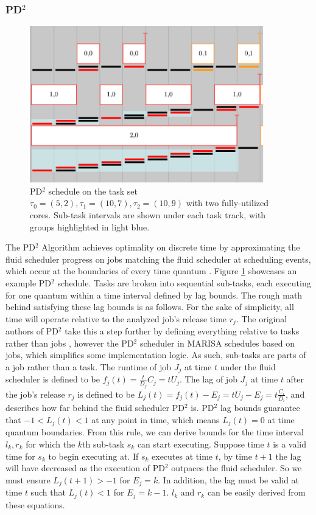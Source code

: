 \documentclass[conference,compsoc]{IEEEtran}
\begin{document}
\subsubsection{PD$^2$}
\begin{figure}
\includegraphics[width=4in]{MARISA_pd2.png}
\caption{PD$^2$ schedule on the task set $\tau_0 = (5,2), \tau_1 = (10,7), \tau_2 = (10, 9)$ with two fully-utilized cores. Sub-task intervals are shown under each task track, with groups highlighted in light blue.}
\label{fig_pd2}
\end{figure}
The PD$^2$ Algorithm achieves optimality on discrete time by approximating the fluid scheduler progress on jobs matching the fluid scheduler at scheduling events, which occur at the boundaries of every time quantum \cite{pd2}. Figure \ref{fig_pd2} showcases an example PD$^2$ schedule. Tasks are broken into sequential sub-tasks, each executing for one quantum within a time interval defined by lag bounds. The rough math behind satisfying these lag bounds is as follows. For the sake of simplicity, all time will operate relative to the analyzed job's release time $r_j$. The original authors of PD$^2$ take this a step further by defining everything relative to tasks rather than jobs \cite{pd2}, however the PD$^2$ scheduler in MARISA schedules based on jobs, which simplifies some implementation logic. As such, sub-tasks are parts of a job rather than a task. The runtime of job $J_j$ at time $t$ under the fluid scheduler is defined to be $f_j(t) = \frac{t}{D_j}C_j = tU_j$. The lag of job $J_j$ at time $t$ after the job's release $r_j$ is defined to be $L_j(t) = f_j(t) - E_j = tU_j - E_j = t\frac{C_i}{D_i}$, and describes how far behind the fluid scheduler PD$^2$ is. PD$^2$ lag bounds guarantee that $-1 < L_j(t) < 1$ at any point in time, which means $L_j(t) = 0$ at time quantum boundaries. From this rule, we can derive bounds for the time interval $l_k, r_k$ for which the $k$th sub-task $s_k$ can start executing. Suppose time $t$ is a valid time for $s_k$ to begin executing at. If $s_k$ executes at time $t$, by time $t+1$ the lag will have decreased as the execution of PD$^2$ outpaces the fluid scheduler. So we must ensure $L_j(t+1) > -1$ for $E_j = k$. In addition, the lag must be valid at time $t$ such that $L_j(t) < 1$ for $E_j = k-1$. $l_k$ and $r_k$ can be easily derived from these equations.
\end{document}
